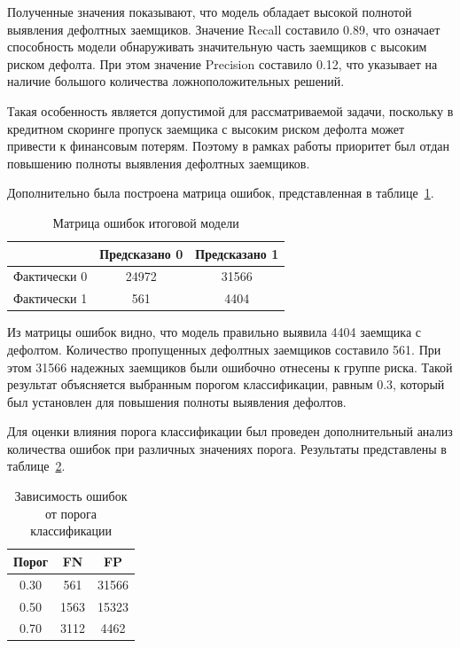 Полученные значения показывают, что модель обладает высокой полнотой выявления дефолтных заемщиков. Значение Recall составило 0.89, что означает способность модели обнаруживать значительную часть заемщиков с высоким риском дефолта. При этом значение Precision составило 0.12, что указывает на наличие большого количества ложноположительных решений.

Такая особенность является допустимой для рассматриваемой задачи, поскольку в кредитном скоринге пропуск заемщика с высоким риском дефолта может привести к финансовым потерям. Поэтому в рамках работы приоритет был отдан повышению полноты выявления дефолтных заемщиков.

Дополнительно была построена матрица ошибок, представленная в таблице~\ref{tab:confusion_matrix}.

\begin{table}[ht!]
  \centering
  \caption{Матрица ошибок итоговой модели}
  \label{tab:confusion_matrix}
  \begin{tabular}{|c|c|c|}
    \hline
                 & Предсказано 0 & Предсказано 1 \\
    \hline
    Фактически 0 & 24972         & 31566         \\
    \hline
    Фактически 1 & 561           & 4404          \\
    \hline
  \end{tabular}
\end{table}

Из матрицы ошибок видно, что модель правильно выявила 4404 заемщика с дефолтом. Количество пропущенных дефолтных заемщиков составило 561. При этом 31566 надежных заемщиков были ошибочно отнесены к группе риска. Такой результат объясняется выбранным порогом классификации, равным 0.3, который был установлен для повышения полноты выявления дефолтов.

Для оценки влияния порога классификации был проведен дополнительный анализ количества ошибок при различных значениях порога. Результаты представлены в таблице~\ref{tab:threshold}.

\begin{table}[ht!]
  \centering
  \caption{Зависимость ошибок от порога классификации}
  \label{tab:threshold}
  \begin{tabular}{|c|c|c|}
    \hline
    Порог & FN   & FP    \\
    \hline
    0.30  & 561  & 31566 \\
    0.50  & 1563 & 15323 \\
    0.70  & 3112 & 4462  \\
    \hline
  \end{tabular}
\end{table}

